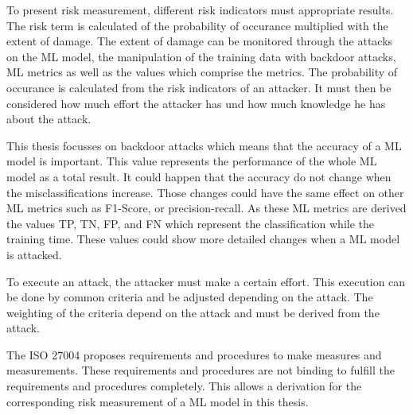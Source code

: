 \begin{hypotheses}
  \item To present risk measurement, different risk indicators must appropriate results. The risk term is calculated of the probability of occurance multiplied with the extent
        of damage. The extent of damage can be monitored through the attacks on the ML model, the manipulation of the training data with backdoor attacks, ML metrics as well as the
        values which comprise the metrics. The probability of occurance is calculated from the risk indicators of an attacker. It must then be considered how much effort the attacker
        has und how much knowledge he has about the attack. \label{itm:h1}
  \item This thesis focusses on backdoor attacks which means that the accuracy of a ML model is important. This value represents the performance of the whole ML model as a
        total result. It could happen that the accuracy do not change when the misclassifications increase. Those changes could have the same effect on other ML metrics such as
        F1-Score, or precision-recall. As these ML metrics are derived the values TP, TN, FP, and FN which represent the classification while the training time. These values could
        show more detailed changes when a ML model is attacked. \label{itm:h2}
  \item To execute an attack, the attacker must make a certain effort. This execution can be done by common criteria and be adjusted depending on the attack.
        The weighting of the criteria depend on the attack and must be derived from the attack. \label{itm:h3}
  \item The ISO 27004 proposes requirements and procedures to make measures and measurements. These requirements and procedures are not binding to fulfill the
        requirements and procedures completely. This allows a derivation for the corresponding risk measurement of a ML model in this thesis. \label{itm:h4}
\end{hypotheses}

